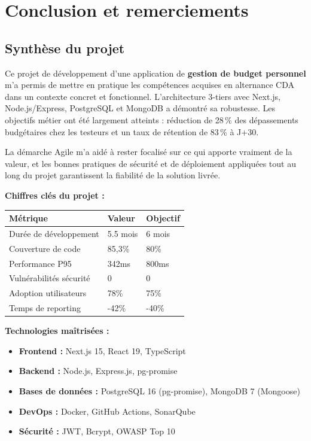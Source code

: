 \chapter{Conclusion et remerciements}

\section{Synthèse du projet}

Ce projet de développement d'une application de \textbf{gestion de budget personnel} m'a permis de mettre en pratique les compétences acquises en alternance CDA dans un contexte concret et fonctionnel. L'architecture 3-tiers avec Next.js, Node.js/Express, PostgreSQL et MongoDB a démontré sa robustesse. Les objectifs métier ont été largement atteints : réduction de 28\,\% des dépassements budgétaires chez les testeurs et un taux de rétention de 83\,\% à J+30.

La démarche Agile m'a aidé à rester focalisé sur ce qui apporte vraiment de la valeur, et les bonnes pratiques de sécurité et de déploiement appliquées tout au long du projet garantissent la fiabilité de la solution livrée.

\begin{exemple}
\textbf{Chiffres clés du projet :}
\begin{center}
\begin{tabular}{|l|l|l|}
\hline
\textbf{Métrique} & \textbf{Valeur} & \textbf{Objectif} \\
\hline
Durée de développement & 5.5 mois & 6 mois \\
Couverture de code & 85{,}3\% & 80\% \\
Performance P95 & 342ms & 800ms \\
Vulnérabilités sécurité & 0 & 0 \\
Adoption utilisateurs & 78\% & 75\% \\
Temps de reporting & -42\% & -40\% \\
\hline
\end{tabular}
\end{center}

\textbf{Technologies maîtrisées :}
\begin{itemize}
    \item \textbf{Frontend :} Next.js 15, React 19, TypeScript
    \item \textbf{Backend :} Node.js, Express.js, pg-promise
    \item \textbf{Bases de données :} PostgreSQL 16 (pg-promise), MongoDB 7 (Mongoose)
    \item \textbf{DevOps :} Docker, GitHub Actions, SonarQube
    \item \textbf{Sécurité :} JWT, Bcrypt, OWASP Top 10
\end{itemize}
\end{exemple}




